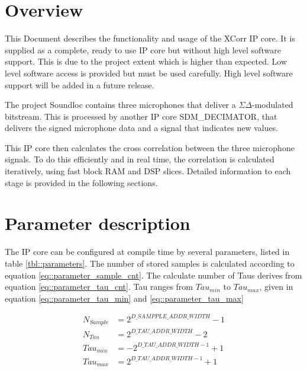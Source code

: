 


\maketitle

\section{Overview}
\label{sec:overview}

This Document describes the functionality and usage of the XCorr IP core.
It is supplied as a complete, ready to use IP core but without high level software support.
This is due to the project extent which is higher than expected.
Low level software access is provided but must be used carefully.
High level software support will be added in a future release.

The project Soundloc contains three microphones that deliver a $\Sigma\Delta$-modulated bitstream.
This is processed by another IP core SDM\_DECIMATOR, that delivers the signed microphone data and a signal that indicates new values.

This IP core then calculates the cross correlation between the three microphone signals.
To do this efficiently and in real time, the correlation is calculated iteratively, using fast block RAM and DSP slices.
Detailed information to each stage is provided in the following sections.

\section{Parameter description}
\label{sec::parameters}

The IP core can be configured at compile time by several parameters, listed in table \ref{tbl::parameters}.
The number of stored samples is calculated according to equation \ref{eq::parameter_sample_cnt}.
The calculate number of Taus derives from equation \ref{eq::parameter_tau_cnt}.
Tau ranges from $Tau_{min}$ to $Tau_{max}$, given in equation \ref{eq::parameter_tau_min} and \ref{eq::parameter_tau_max}

\begin{align}
	N_{Sample} &= 2^{D\_SAMPPLE\_ADDR\_WIDTH}-1 \label{eq::parameter_sample_cnt} \\
	N_{Tau} &=2^{D\_TAU\_ADDR\_WIDTH}-2 \label{eq::parameter_tau_cnt} \\
	Tau_{min} &= -2^{D\_TAU\_ADDR\_WIDTH - 1}+1 \label{eq::parameter_tau_min} \\
	Tau_{max} &= 2^{D\_TAU\_ADDR\_WIDTH - 1}+1 \label{eq::parameter_tau_max}
\end{align}

